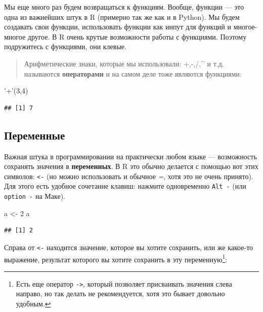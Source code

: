 \documentclass[
]{book}
\newenvironment{Shaded}{\begin{snugshade}}{\end{snugshade}}
\newcommand{\DecValTok}[1]{\textcolor[rgb]{0.00,0.00,0.81}{#1}}
\newcommand{\NormalTok}[1]{#1}
\newcommand{\StringTok}[1]{\textcolor[rgb]{0.31,0.60,0.02}{#1}}
\begin{document}
Мы еще много раз будем возвращаться к функциям. Вообще, функции --- это одна из важнейших штук в R (примерно так же как и в Python). Мы будем создавать свои функции, использовать функции как инпут для функций и многое-многое другое. В R очень крутые возможности работы с функциями. Поэтому подружитесь с функциями, они клевые.

\begin{quote}
Арифметические знаки, которые мы использовали: +,-,/,\^{} и т.д. называются \textbf{операторами} и на самом деле тоже являются функциями:
\end{quote}

\begin{Shaded}
\begin{Highlighting}[]
\StringTok{'+'}\NormalTok{(}\DecValTok{3}\NormalTok{,}\DecValTok{4}\NormalTok{)}
\end{Highlighting}
\end{Shaded}

\begin{verbatim}
## [1] 7
\end{verbatim}

\hypertarget{variables}{%
\subsection{Переменные}\label{variables}}

Важная штука в программировании на практически любом языке --- возможность сохранять значения в \textbf{переменных}. В R это обычно делается с помощью вот этих символов: \texttt{\textless{}-} (но можно использовать и обычное \emph{=}, хотя это не очень принято). Для этого есть удобное сочетание клавиш: нажмите одновременно \texttt{Alt\ -} (или \texttt{option\ -} на Маке).

\begin{Shaded}
\begin{Highlighting}[]
\NormalTok{a <-}\StringTok{ }\DecValTok{2}
\NormalTok{a}
\end{Highlighting}
\end{Shaded}

\begin{verbatim}
## [1] 2
\end{verbatim}

Справа от \texttt{\textless{}-} находится значение, которое вы хотите сохранить, или же какое-то выражение, результат которого вы хотите сохранить в эту переменную\footnote{Есть еще оператор \texttt{-\textgreater{}}, который позволяет присваивать значения слева направо, но так делать не рекомендуется, хотя это бывает довольно удобным.}:
\end{document}
